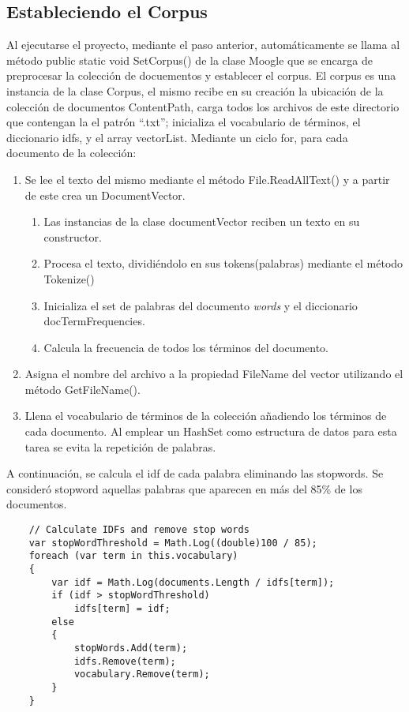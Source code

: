 \documentclass[a4paper,12pt,twocolumn]{article}
\begin{document}
\begin{enumerate}
\subsection{Estableciendo el Corpus}
Al ejecutarse el proyecto, mediante el paso anterior, automáticamente se llama al método public
static void SetCorpus() de la clase Moogle que se encarga de preprocesar la colección de docuementos y establecer el corpus.
El corpus es una instancia de la clase Corpus, el mismo recibe en su creación la ubicación de
la colección de documentos ContentPath, carga todos los archivos de este directorio que
contengan la el patrón “.txt”; inicializa el vocabulario de términos, el diccionario idfs, y el array
vectorList.
Mediante un ciclo for, para cada documento de la colección:
\begin{enumerate}
    \item Se lee el texto del mismo mediante el método File.ReadAllText() y a partir de este crea
    un DocumentVector.
    \begin{enumerate}
        \item Las instancias de la clase documentVector reciben un texto en su constructor.
        \item Procesa el texto, dividiéndolo en sus tokens(palabras) mediante el método
        Tokenize()
        \item Inicializa el set de palabras del documento \emph{words} y el diccionario
        docTermFrequencies.
        \item Calcula la frecuencia de todos los términos del documento.
    \end{enumerate}
    \item Asigna el nombre del archivo a la propiedad FileName del vector utilizando el método
    GetFileName().
    \item Llena el vocabulario de términos de la colección añadiendo los términos de cada
    documento. Al emplear un HashSet como estructura de datos para esta tarea se evita la
    repetición de palabras.
\end{enumerate}
    A continuación, se calcula el idf de cada palabra eliminando las stopwords. Se consideró stopword aquellas
    palabras que aparecen en más del 85\% de los documentos.

\begin{verbatim}
    // Calculate IDFs and remove stop words
    var stopWordThreshold = Math.Log((double)100 / 85);
    foreach (var term in this.vocabulary)
    {
        var idf = Math.Log(documents.Length / idfs[term]);
        if (idf > stopWordThreshold)
            idfs[term] = idf;
        else
        {
            stopWords.Add(term);
            idfs.Remove(term);
            vocabulary.Remove(term);
        }
    }
\end{verbatim}


\end{enumerate}
\end{document}
